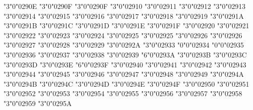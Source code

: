 \mchardef\leftdbkarrow"3"0"0290E
\mchardef\dbkarow"3"0"0290F
\mchardef\rightdbkarrow"3"0"0290F
\mchardef\drbkarow"3"0"02910
\mchardef\rightdotarrow"3"0"02911
\mchardef\baruparrow"3"0"02912
\mchardef\downarrowbar"3"0"02913
\mchardef\nvrightarrowtail"3"0"02914
\mchardef\nVrightarrowtail"3"0"02915
\mchardef\twoheadrightarrowtail"3"0"02916
\mchardef\nvtwoheadrightarrowtail"3"0"02917
\mchardef\nVtwoheadrightarrowtail"3"0"02918
\mchardef\lefttail"3"0"02919
\mchardef\righttail"3"0"0291A
\mchardef\leftdbltail"3"0"0291B
\mchardef\rightdbltail"3"0"0291C
\mchardef\diamondleftarrow"3"0"0291D
\mchardef\rightarrowdiamond"3"0"0291E
\mchardef\diamondleftarrowbar"3"0"0291F
\mchardef\barrightarrowdiamond"3"0"02920
\mchardef\nwsearrow"3"0"02921
\mchardef\neswarrow"3"0"02922
\mchardef\hknwarrow"3"0"02923
\mchardef\hknearrow"3"0"02924
\mchardef\hksearow"3"0"02925
\mchardef\hksearrow"3"0"02925
\mchardef\hkswarow"3"0"02926
\mchardef\hkswarrow"3"0"02926
\mchardef\tona"3"0"02927
\mchardef\toea"3"0"02928
\mchardef\tosa"3"0"02929
\mchardef\towa"3"0"0292A
\mchardef\rightcurvedarrow"3"0"02933
\mchardef\uprightcurvearrow"0"0"02934
\mchardef\downrightcurvedarrow"0"0"02935
\mchardef\leftdowncurvedarrow"3"0"02936
\mchardef\rightdowncurvedarrow"3"0"02937
\mchardef\cwrightarcarrow"3"0"02938
\mchardef\acwleftarcarrow"3"0"02939
\mchardef\acwoverarcarrow"6"0"0293A
\mchardef\acwunderarcarrow"3"0"0293B
\mchardef\curvearrowrightminus"3"0"0293C
\mchardef\curvearrowleftplus"3"0"0293D
\mchardef\cwundercurvearrow"3"0"0293E
\mchardef\ccwundercurvearrow"6"0"0293F
\mchardef\acwcirclearrow"3"0"02940
\mchardef\cwcirclearrow"3"0"02941
\mchardef\rightarrowshortleftarrow"3"0"02942
\mchardef\leftarrowshortrightarrow"3"0"02943
\mchardef\shortrightarrowleftarrow"3"0"02944
\mchardef\rightarrowplus"3"0"02945
\mchardef\leftarrowplus"3"0"02946
\mchardef\rightarrowx"3"0"02947
\mchardef\leftrightarrowcircle"3"0"02948
\mchardef\twoheaduparrowcircle"3"0"02949
\mchardef\leftrightharpoonupdown"3"0"0294A
\mchardef\leftrightharpoondownup"3"0"0294B
\mchardef\updownharpoonrightleft"3"0"0294C
\mchardef\updownharpoonleftright"3"0"0294D
\mchardef\leftrightharpoonupup"3"0"0294E
\mchardef\updownharpoonrightright"3"0"0294F
\mchardef\leftrightharpoondowndown"3"0"02950
\mchardef\updownharpoonleftleft"3"0"02951
\mchardef\barleftharpoonup"3"0"02952
\mchardef\rightharpoonupbar"3"0"02953
\mchardef\barupharpoonright"3"0"02954
\mchardef\downharpoonrightbar"3"0"02955
\mchardef\barleftharpoondown"3"0"02956
\mchardef\rightharpoondownbar"3"0"02957
\mchardef\barupharpoonleft"3"0"02958
\mchardef\downharpoonleftbar"3"0"02959
\mchardef\leftharpoonupbar"3"0"0295A
